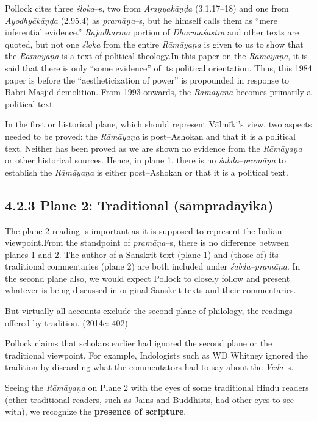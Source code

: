 Pollock cites three \textit{śloka}–s, two from \textit{Araṇyakāṇḍa} (3.1.17–18) and one from \textit{Ayodhyākāṇḍa} (2.95.4) as \textit{pramāṇa}–s, but he himself calls them as “mere inferential evidence.” \textit{Rājadharma} portion of \textit{Dharmaśāstra} and other texts are quoted, but not one \textit{śloka} from the entire \textit{Rāmāyaṇa} is given to us to show that the \textit{Rāmāyaṇa} is a text of political theology.In this paper on the \textit{Rāmāyaṇa}, it is said that there is only “some evidence” of its political orientation. Thus, this 1984 paper is before the “aestheticization of power” is propounded in response to Babri Masjid demolition. From 1993 onwards, the \textit{Rāmāyaṇa} becomes primarily a political text.

In the first or historical plane, which should represent Vālmīki’s view, two aspects needed to be proved: the \textit{Rāmāyaṇa} is post–Ashokan and that it is a political text. Neither has been proved as we are shown no evidence from the \textit{Rāmāyaṇa} or other historical sources. Hence, in plane 1, there is no \textit{śabda}–\textit{pramāṇa} to establish the \textit{Rāmāyaṇa} is either post–Ashokan or that it is a political text.


\subsection*{4.2.3 Plane 2: Traditional (sāmpradāyika)}

The plane 2 reading is important as it is supposed to represent the Indian viewpoint.From the standpoint of \textit{pramāṇa}–s, there is no difference between planes 1 and 2. The author of a Sanskrit text (plane 1) and (those of) its traditional commentaries (plane 2) are both included under \textit{śabda–pramāṇa}. In the second plane also, we would expect Pollock to closely follow and present whatever is being discussed in original Sanskrit texts and their commentaries.

\begin{myquote}
But virtually all accounts exclude the second plane of philology, the readings offered by tradition. (2014c: 402)
\end{myquote}

Pollock claims that scholars earlier had ignored the second plane or the traditional viewpoint. For example, Indologists such as WD Whitney ignored the tradition by discarding what the commentators had to say about the \textit{Veda}–s.

\begin{myquote}
Seeing the \textit{Rāmāyaṇa} on Plane 2 with the eyes of some traditional Hindu readers (other traditional readers, such as Jains and Buddhists, had other eyes to see with), we recognize the \textbf{presence of scripture}.
\end{myquote}

